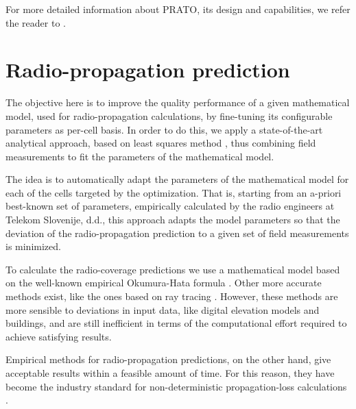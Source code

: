 For more detailed information about PRATO, its design and capabilities,
we refer the reader to \cite{Benedicic-A_GRASS_GIS_parallel_module_for_radio-propagation_predictions:2013}.


\section{Radio-propagation prediction}\label{sec:Radio-propagation-prediction}

The objective here is to improve the quality performance of a given
mathematical model, used for radio-propagation calculations, by fine-tuning
its configurable parameters as per-cell basis. In order to do this,
we apply a state-of-the-art analytical approach, based on least squares
method \cite{Yang_A_linear_least_square_method_of_propagation_model_tuning_for_3G_radion_network_planning:2008},
thus combining field measurements to fit the parameters of the mathematical
model.

The idea is to automatically adapt the parameters of the mathematical
model for each of the cells targeted by the optimization. That is,
starting from an a-priori best-known set of parameters, empirically
calculated by the radio engineers at Telekom Slovenije, d.d., this
approach adapts the model parameters so that the deviation of the
radio-propagation prediction to a given set of field measurements
is minimized.

To calculate the radio-coverage predictions we use a mathematical
model based on the well-known empirical Okumura-Hata formula \cite{Hata-Empirical_formula_for_propagation_loss_in_land_mobile_radio_services:1980}.
Other more accurate methods exist, like the ones based on ray tracing
\cite{Corre_Three_dimensional_urban_EM_wave_propagation_model_for_radio_network_planning_and_optimization_over_large_areas:2009,Vilhar-Efficient_open_source_ray_tracing_methods_for_rural_environment:efficient}.
However, these methods are more sensible to deviations in input data,
like digital elevation models and buildings, and are still inefficient
in terms of the computational effort required to achieve satisfying
results.

Empirical methods for radio-propagation predictions, on the other
hand, give acceptable results within a feasible amount of time. For
this reason, they have become the industry standard for non-deterministic
propagation-loss calculations \cite{Aarnaes-Tuning_of_empirical_radio_propagation_models_effect_of_location_accuracy:2004,Begovic_Applicability_evaluation_of_Okumura_Ericsson_and_Winner_propagation_models_for_coverage_planning:2012,Cichon_Propagation.prediction.models:1995,Filiposka_Terrain_aware_three_dimensional_radio_propagation_model_extension_for_NS2:2011,Hata-Empirical_formula_for_propagation_loss_in_land_mobile_radio_services:1980,Ozimek_Open.source.radio.coverage.prediction:2010}.


